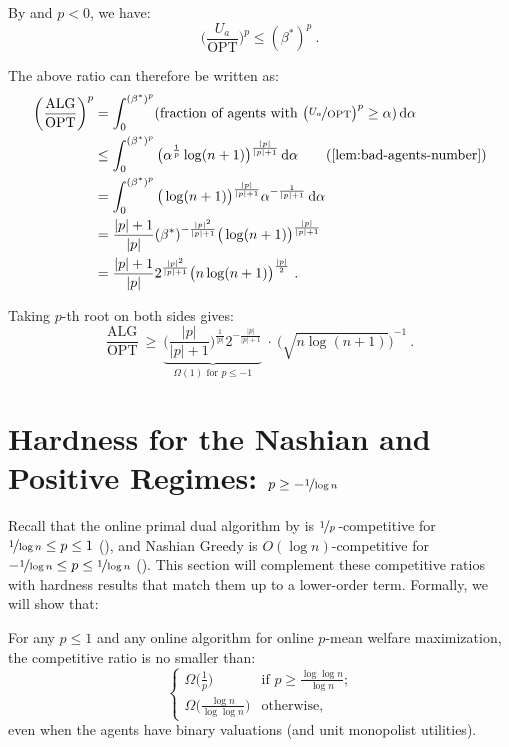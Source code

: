 \documentclass[11pt,letterpaper]{article}
\newcommand{\OPT}{\mathrm{OPT}}
\newcommand{\ALG}{\mathrm{ALG}}
\newcommand{\dif}[1]{\,\text{\rm d} #1}
\newcommand{\utility}{U}
\begin{document}
By  and $p < 0$, we have:
\[
	\bigg(\frac{\utility_a}{\OPT}\bigg)^p \le (\beta^*)^p
	~.
\]

The above ratio can therefore be written as:
\begin{align*}
	\bigg( \frac{\ALG}{\OPT} \bigg)^p
	& = \int_0^{(\beta^*)^p} (\text{fraction of agents with $\big( \nicefrac{\utility_a}{\OPT} \big)^p \ge \alpha$)} \dif{\alpha} \\
	&
	\le \int_0^{(\beta^*)^p} \big( \alpha^{\frac{1}{p}} \log(n+1) \big)^{\frac{|p|}{|p|+1}} \dif{\alpha} 
	\tag{\Cref{lem:bad-agents-number}} \\
	&
	= \int_0^{(\beta^*)^p} \big( \log(n+1) \big)^{\frac{|p|}{|p|+1}} \alpha^{-\frac{1}{|p|+1}} \dif{\alpha} \\
	&
	= \frac{|p|+1}{|p|} (\beta^*)^{-\frac{|p|^2}{|p|+1}} \big(\log(n+1) \big)^{\frac{|p|}{|p|+1}} \\
	&
	= \frac{|p|+1}{|p|} 2^{{\frac{|p|^2}{|p|+1}}} \big( n \log(n+1) \big)^{\frac{|p|}{2}}
	~.
\end{align*}

Taking $p$-th root on both sides gives:
\[
	\frac{\ALG}{\OPT} ~\ge~ \underbrace{\bigg( \frac{|p|}{|p|+1} \bigg)^{\frac{1}{|p|}} 2^{-{\frac{|p|}{|p|+1}}}}_{\text{$\Omega(1)$ for $p \le -1$}} ~\cdot~ {\Big(\sqrt{n \log(n+1)}\Big)}^{-1}
	~.
\]




 \section[Hardness for the Nashian and Positive Regimes]{Hardness for the Nashian and Positive Regimes: $p \ge -\nicefrac{1}{\log n}$}

Recall that the online primal dual algorithm by \citet{DevanurJ:STOC:2012} is $\nicefrac{1}{p}$\,-competitive for $\nicefrac{1}{\log n} \le p \le 1$ (), and Nashian Greedy is $O(\log n)$-competitive for $- \nicefrac{1}{\log n} \le p \le \nicefrac{1}{\log n}$ ().
This section will complement these competitive ratios with hardness results that match them up to a lower-order term.
Formally, we will show that:

\begin{theorem}
    \label{thm:hardness-positive}
    For any $p \le 1$ and any online algorithm for online $p$-mean welfare maximization, the competitive ratio is no smaller than:
    \[
    	\begin{cases}
    	    \Omega \big( \frac{1}{p} \big) & \mbox{if $p \ge \frac{\log\log n}{\log n}$;} \\[1ex]
            \Omega \big( \frac{\log n}{\log\log n} \big) & \mbox{otherwise,}
    	\end{cases}
    \]
    even when the agents have binary valuations (and unit monopolist utilities).
\end{theorem}
\end{document}
